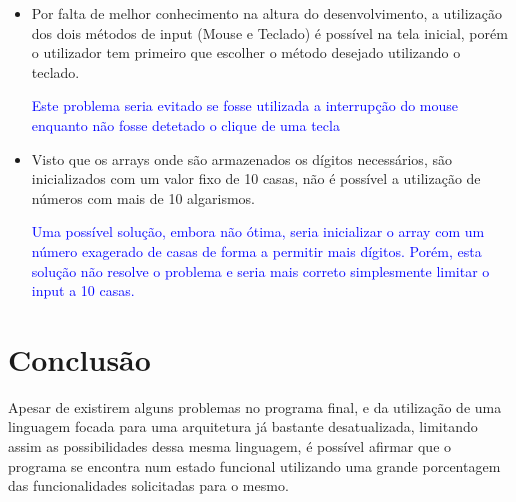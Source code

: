 \begin{itemize}
	\item Por falta de melhor conhecimento na altura do desenvolvimento, a utilização dos dois métodos de input (Mouse e Teclado) é possível na tela inicial, porém  o utilizador tem primeiro que escolher o método desejado utilizando o teclado.
	\begin{adjustwidth*}{0.5cm}{0cm}
		\textcolor{blue}{Este problema seria evitado se fosse utilizada a interrupção do mouse enquanto não fosse detetado o clique de uma tecla\\}
	\end{adjustwidth*}
	
	\item Visto que os arrays onde são armazenados os dígitos necessários, são inicializados com um valor fixo de 10 casas, não é possível a utilização de números com mais de 10 algarismos.
	\begin{adjustwidth*}{0.5cm}{0cm}
		\textcolor{blue}{Uma possível solução, embora não ótima, seria inicializar o array com um número exagerado de casas de forma a permitir mais dígitos. Porém, esta solução não resolve o problema e seria mais correto simplesmente limitar o input a 10 casas. \\}
	\end{adjustwidth*}
\end{itemize}

\chapter*{Conclusão}
\normalsize
Apesar de existirem alguns problemas no programa final,  e da utilização de uma linguagem focada para uma arquitetura já bastante desatualizada, limitando assim as possibilidades dessa mesma linguagem, é possível afirmar que o programa se encontra num estado funcional utilizando uma grande porcentagem das funcionalidades solicitadas para o mesmo.  
